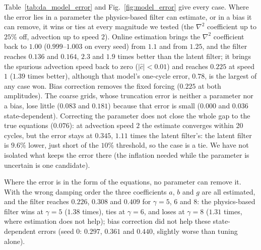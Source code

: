  Table~\ref{tab:da_model_error} and Fig.~\ref{fig:model_error} give every case. Where the
error lies in a parameter the physics-based filter can estimate, or in a bias it can remove, it wins or
ties at every magnitude we tested (the $\nabla^2$ coefficient up to $25\%$ off, advection up to speed $2$). Online estimation brings the
$\nabla^2$ coefficient back to $1.00$ ($0.999$--$1.003$ on every seed) from $1.1$ and from $1.25$, and the
filter reaches $0.136$ and $0.164$, $2.3$ and $1.9$ times better than the latent filter; it brings the
spurious advection speed back to zero ($|\hat c|<0.01$) and reaches $0.225$ at speed $1$ ($1.39$ times
better), although that model's one-cycle error, $0.78$, is the largest of any case won. Bias correction
removes the fixed forcing ($0.225$ at both amplitudes). The coarse grids, whose truncation error is
neither a parameter nor a bias, lose little ($0.083$ and $0.181$) because that error is small
($0.000$ and $0.036$ state-dependent). Correcting the parameter does not close the whole gap to the true equations ($0.076$): at
advection speed $2$ the estimate converges within 20 cycles, but the error stays at $0.345$, $1.11$ times
the latent filter's: the latent filter is $9.6\%$ lower, just short of the $10\%$ threshold, so the
case is a tie. We have not isolated what keeps the error there (the inflation needed while the
parameter is uncertain is one candidate).

Where the error is in the form of the equations, no parameter can remove it. With the wrong damping
order the three coefficients $a$, $b$ and $g$ are all estimated, and the filter reaches $0.226$, $0.308$
and $0.409$ for $\gamma=5$, $6$ and $8$: the physics-based filter wins at $\gamma=5$ ($1.38$ times), ties at
$\gamma=6$, and loses at $\gamma=8$ ($1.31$ times, where estimation does not help); bias correction did not help
these state-dependent errors (seed 0: $0.297$, $0.361$ and $0.440$, slightly worse than tuning alone).

